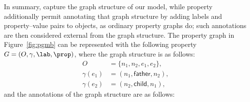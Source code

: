 In summary, \datas capture the graph structure of our model, while property \datas additionally permit annotating that graph structure by adding labels and property--value pairs to objects, as ordinary property graphs do; such annotations are then considered external from the graph structure. The property graph in Figure~\ref{fig:pgmb}
can be represented with the following property \data $G=(O,\gamma,\lab,\prop)$, where the graph structure is as follows:
{\small
\begin{align*}
O & = \{n_1,n_2,e_1,e_2\}, \\%
\gamma(e_1) & = (n_1,\textsf{father},n_2),\\%
\gamma(e_2) & = (n_2,\textsf{child},n_1),
\end{align*}}
and the annotations of the graph structure are as follows:
\vspace{-2mm}
